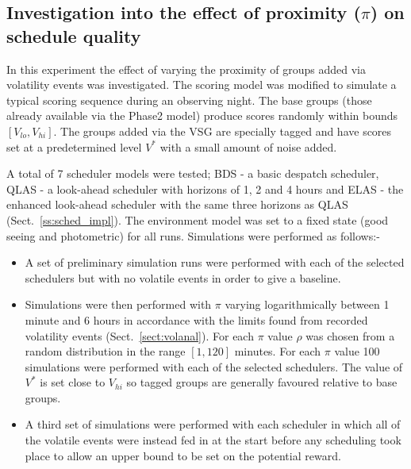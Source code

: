 
\subsection{Investigation into the effect of proximity ($\pi$) on schedule quality}
In this experiment the effect of varying the proximity of groups added via volatility events was investigated. The scoring model was modified to simulate a typical scoring sequence during an observing night. The base groups (those already available via the Phase2 model) produce scores randomly within bounds $[V_{lo}, V_{hi}]$. The groups added via the VSG are specially tagged and have scores set at a predetermined level $V^*$ with a small amount of noise added. 

A total of 7 scheduler models were tested; BDS - a basic despatch scheduler, QLAS - a look-ahead scheduler with horizons of 1, 2 and 4 hours and ELAS - the enhanced look-ahead scheduler with the same three horizons as QLAS (Sect.~\ref{ss:sched_impl}). The environment model was set to a fixed state (good seeing and photometric) for all runs. Simulations were performed as follows:-

\begin{itemize}
\item A set of preliminary simulation runs were performed with each of the selected schedulers but with no volatile events in order to give a baseline.
\item Simulations were then performed with $\pi$ varying logarithmically between 1 minute and 6 hours  in accordance with the limits found from recorded volatility events (Sect.~\ref{sect:volanal}). For each $\pi$ value $\rho$ was chosen from a random distribution in the range $[1, 120]$ minutes. For each $\pi$ value 100 simulations were performed with each of the selected schedulers. The value of $V^*$ is set close to $V_{hi}$ so tagged groups are generally favoured relative to base groups.
\item A third set of simulations were performed with each scheduler in which all of the volatile events were instead fed in at the start before any scheduling took place to allow an upper bound to be set on the potential reward.
\end{itemize}

